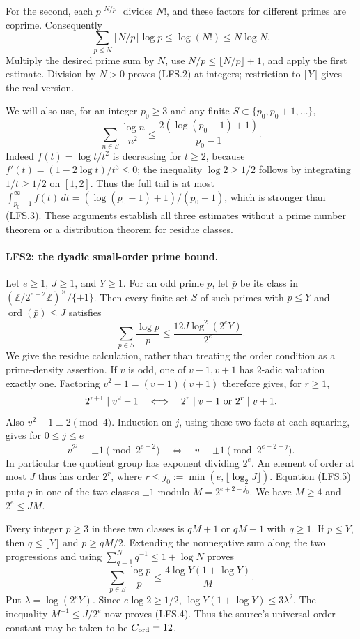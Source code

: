 For the second, each $p^{\lfloor N/p\rfloor}$ divides $N!$, and
these factors for different primes are coprime.  Consequently
\[
 \sum_{p\le N}\lfloor N/p\rfloor\log p\le\log(N!)
       \le N\log N.
\]
Multiply the desired prime sum by $N$, use
$N/p\le\lfloor N/p\rfloor+1$, and apply the first estimate.
Division by $N>0$ proves (LFS.2) at integers; restriction to
$\lfloor Y\rfloor$ gives the real version.

We will also use, for an integer $p_0\ge3$ and any finite
$S\subset\{p_0,p_0+1,\ldots\}$,
\[
 \sum_{n\in S}\frac{\log n}{n^2}
 \le \frac{2(\log(p_0-1)+1)}{p_0-1}.                    \tag{LFS.3}
\]
Indeed $f(t)=\log t/t^2$ is decreasing for $t\ge2$, because
$f'(t)=(1-2\log t)/t^3\le0$; the inequality
$\log2\ge1/2$ follows by integrating $1/t\ge1/2$ on $[1,2]$.
Thus the full tail is at most
$\int_{p_0-1}^\infty f(t)\,dt=(\log(p_0-1)+1)/(p_0-1)$,
which is stronger than (LFS.3).  These arguments establish all three
estimates without a prime number theorem or a distribution theorem
for residue classes.

\paragraph{LFS2: the dyadic small-order prime bound.}
\label{claim:LFS2}
Let $e\ge1$, $J\ge1$, and $Y\ge1$.  For an odd prime $p$, let
$\bar p$ be its class in
$(\mathbb Z/2^{e+2}\mathbb Z)^\times/\{\pm1\}$.
Then every finite set $S$ of such primes with $p\le Y$ and
$\operatorname{ord}(\bar p)\le J$ satisfies
\[
 \sum_{p\in S}\frac{\log p}{p}
 \le\frac{12J\log^2(2^eY)}{2^e}.                       \tag{LFS.4}
\]
We give the residue calculation, rather than treating the order
condition as a prime-density assertion.  If $v$ is odd, one of
$v-1,v+1$ has 2-adic valuation exactly one.  Factoring
$v^2-1=(v-1)(v+1)$ therefore gives, for $r\ge1$,
\[
 2^{r+1}\mid v^2-1
 \quad\Longleftrightarrow\quad
 2^r\mid v-1\ \hbox{or}\ 2^r\mid v+1.
\]
Also $v^2+1\equiv2\pmod4$.  Induction on $j$, using these two
facts at each squaring, gives for $0\le j\le e$
\[
 v^{2^j}\equiv\pm1\pmod{2^{e+2}}
 \quad\Longleftrightarrow\quad
 v\equiv\pm1\pmod{2^{e+2-j}}.                          \tag{LFS.5}
\]
In particular the quotient group has exponent dividing $2^e$.
An element of order at most $J$ thus has order $2^r$, where
$r\le j_0:=\min(e,\lfloor\log_2J\rfloor)$.  Equation (LFS.5)
puts $p$ in one of the two classes $\pm1$ modulo
$M=2^{e+2-j_0}$.  We have $M\ge4$ and $2^e\le JM$.

Every integer $p\ge3$ in these two classes is $qM+1$ or $qM-1$
with $q\ge1$.  If $p\le Y$, then $q\le\lfloor Y\rfloor$ and
$p\ge qM/2$.  Extending the nonnegative sum along the two
progressions and using
$\sum_{q=1}^Nq^{-1}\le1+\log N$ proves
\[
 \sum_{p\in S}\frac{\log p}{p}
 \le\frac{4\log Y(1+\log Y)}M.
\]
Put $\lambda=\log(2^eY)$.  Since $e\log2\ge1/2$,
$\log Y(1+\log Y)\le3\lambda^2$.
The inequality $M^{-1}\le J/2^e$ now proves (LFS.4).
Thus the source's universal order constant may be taken to be
$C_{\rm ord}=12$.

